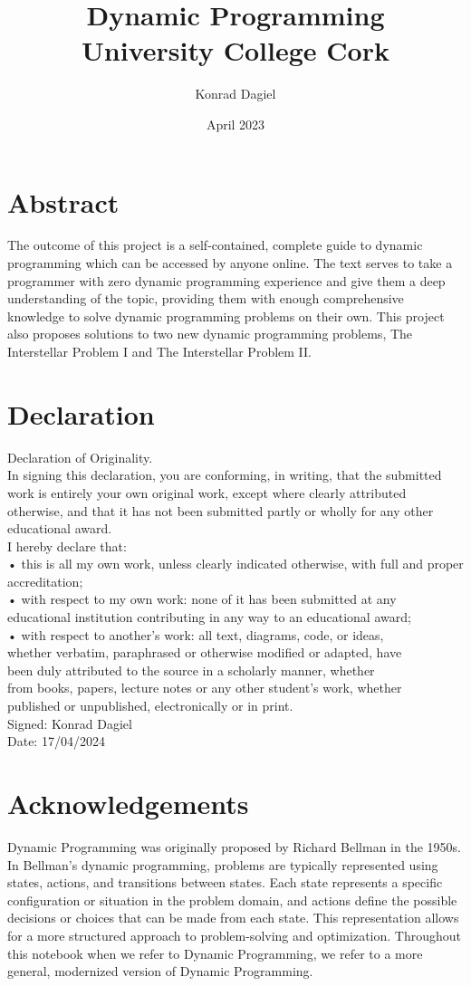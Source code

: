 \documentclass[12pt]{report}
\title{\textbf{Dynamic Programming} \\
\Large{University College Cork}}
\author{Konrad Dagiel}
\date{April 2023}
\theoremstyle{definition}
\begin{document}
\maketitle

\chapter*{Abstract}
The outcome of this project is a self-contained, complete guide to dynamic programming which can 
be accessed by anyone online. The text serves to take a programmer with zero dynamic 
programming experience and give them a deep understanding of the topic, providing them with
enough comprehensive knowledge to solve dynamic programming problems on their own.
This project also proposes solutions to two new dynamic programming problems, The Interstellar Problem I and The Interstellar Problem II.

\chapter*{Declaration}
Declaration of Originality.\\
In signing this declaration, you are conforming, in writing, that the submitted work is entirely your own original work, except where clearly attributed otherwise, and that it has not been submitted partly or wholly for
any other educational award.\\
I hereby declare that:\\
• this is all my own work, unless clearly indicated otherwise, with full
and proper accreditation;\\
• with respect to my own work: none of it has been submitted at any educational institution contributing in any way to an educational award;\\
• with respect to another’s work: all text, diagrams, code, or ideas,\\
whether verbatim, paraphrased or otherwise modified or adapted, have\\
been duly attributed to the source in a scholarly manner, whether\\
from books, papers, lecture notes or any other student’s work, whether\\
published or unpublished, electronically or in print.\\
Signed: Konrad Dagiel\\
Date: 17/04/2024

\chapter*{Acknowledgements}
Dynamic Programming was originally proposed by Richard Bellman in the 1950s.
In Bellman's dynamic programming, problems are typically represented using states, actions, and transitions between states.
Each state represents a specific configuration or situation in the problem domain, and actions define the possible decisions or choices that can be made from each state.
This representation allows for a more structured approach to problem-solving and optimization.
Throughout this notebook when we refer to Dynamic Programming, we refer to a more general, modernized version of Dynamic Programming.
\end{document}

